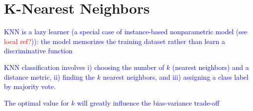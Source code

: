 \section{K-Nearest Neighbors}

\textcolor{blue}{KNN is a lazy learner (a special case of instance-based nonparametric model (see \textcolor{red}{local ref?})): the model memorizes the training dataset rather than learn a discriminative function}

\textcolor{blue}{KNN classification involves i) choosing the number of $k$ (nearest neighbors) and a distance metric, ii) finding the $k$ nearest neighbors, and iii) assigning a class label by majority vote.}

\textcolor{blue}{The optimal value for $k$ will greatly influence the bias-variance trade-off}